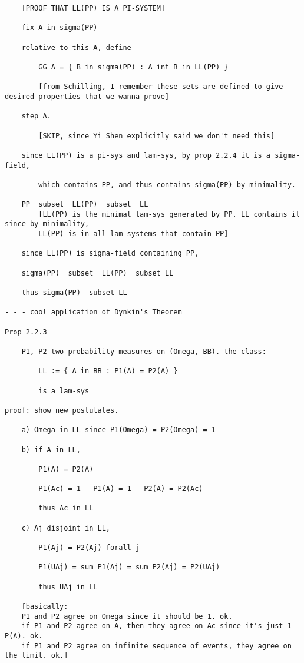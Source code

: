 \documentclass{article}
\begin{document}
\begin{flushleft}
\begin{verbatim}
	[PROOF THAT LL(PP) IS A PI-SYSTEM]	

	fix A in sigma(PP)
	
	relative to this A, define
	
		GG_A = { B in sigma(PP) : A int B in LL(PP) }
		
		[from Schilling, I remember these sets are defined to give desired properties that we wanna prove]

	step A.
	
		[SKIP, since Yi Shen explicitly said we don't need this]
	
	since LL(PP) is a pi-sys and lam-sys, by prop 2.2.4 it is a sigma-field, 
	
		which contains PP, and thus contains sigma(PP) by minimality.
	
	PP  subset  LL(PP)  subset  LL
		[LL(PP) is the minimal lam-sys generated by PP. LL contains it since by minimality, 
		LL(PP) is in all lam-systems that contain PP]
		
	since LL(PP) is sigma-field containing PP, 
	
	sigma(PP)  subset  LL(PP)  subset LL
	
	thus sigma(PP)  subset LL
	
- - - cool application of Dynkin's Theorem

Prop 2.2.3

	P1, P2 two probability measures on (Omega, BB). the class:
	
		LL := { A in BB : P1(A) = P2(A) }
		
		is a lam-sys

proof: show new postulates.

	a) Omega in LL since P1(Omega) = P2(Omega) = 1
	
	b) if A in LL, 
	
		P1(A) = P2(A)
		
		P1(Ac) = 1 - P1(A) = 1 - P2(A) = P2(Ac)
		
		thus Ac in LL
		
	c) Aj disjoint in LL, 
	
		P1(Aj) = P2(Aj) forall j
		
		P1(UAj) = sum P1(Aj) = sum P2(Aj) = P2(UAj)
		
		thus UAj in LL
		
	[basically:
	P1 and P2 agree on Omega since it should be 1. ok.
	if P1 and P2 agree on A, then they agree on Ac since it's just 1 - P(A). ok.
	if P1 and P2 agree on infinite sequence of events, they agree on the limit. ok.]
		

\end{verbatim}
\end{flushleft}
\end{document}
